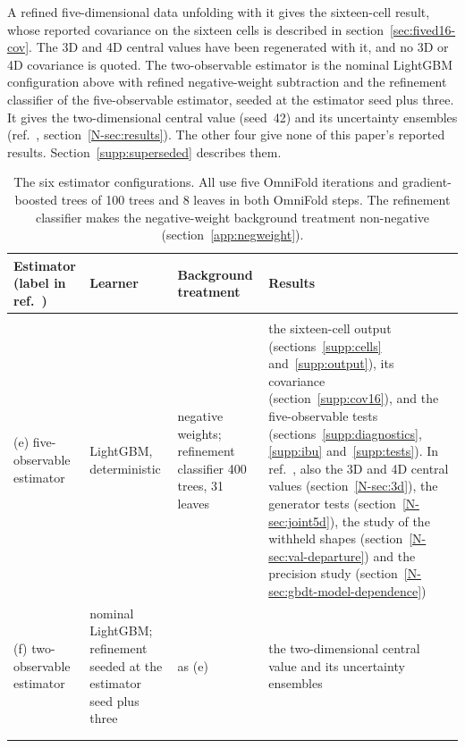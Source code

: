 A refined five-dimensional data unfolding with it gives the sixteen-cell result, whose reported covariance on the sixteen cells is described in section~\ref{sec:fived16-cov}. The 3D and 4D central values have been regenerated with it, and no 3D or 4D covariance is quoted. The two-observable estimator is the nominal LightGBM configuration above with refined negative-weight subtraction and the refinement classifier of the five-observable estimator, seeded at the estimator seed plus three. It gives the two-dimensional central value (seed~42) and its uncertainty ensembles (ref.~\cite{AnalysisNote2026}, section~\ref*{N-sec:results}). The other four give none of this paper's reported results. Section~\ref{supp:superseded} describes them.
\begin{table}[htbp]
\centering
\caption{The six estimator configurations. All use five OmniFold iterations and gradient-boosted trees of 100 trees and 8 leaves in both OmniFold steps. The refinement classifier makes the negative-weight background treatment non-negative (section~\ref{app:negweight}).}
\label{tab:configs}
\small
\begin{tabular}{@{}>{\raggedright\arraybackslash}p{}>{\raggedright\arraybackslash}p{}>{\raggedright\arraybackslash}p{}>{\raggedright\arraybackslash}p{}@{}}
\toprule
Estimator (label in ref.~\cite{AnalysisNote2026}) & Learner & Background treatment & Results \\
\midrule
\multicolumn{4}{@{}l}{\emph{Reported configurations}} \\ \addlinespace
(e) five-observable estimator & LightGBM, deterministic & negative weights; refinement classifier 400 trees, 31 leaves & the sixteen-cell output (sections~\ref{supp:cells} and~\ref{supp:output}), its covariance (section~\ref{supp:cov16}), and the five-observable tests (sections~\ref{supp:diagnostics}, \ref{supp:ibu} and~\ref{supp:tests}). In ref.~\cite{AnalysisNote2026}, also the 3D and 4D central values (section~\ref*{N-sec:3d}), the generator tests (section~\ref*{N-sec:joint5d}), the study of the withheld shapes (section~\ref*{N-sec:val-departure}) and the precision study (section~\ref*{N-sec:gbdt-model-dependence}) \\ \addlinespace
(f) two-observable estimator & nominal LightGBM; refinement seeded at the estimator seed plus three & as (e) & the two-dimensional central value and its uncertainty ensembles \\ \midrule
\multicolumn{4}{@{}l}{\emph{Superseded configurations (section~\ref{supp:superseded})}} \\ \addlinespace

\end{tabular}
\end{table}
